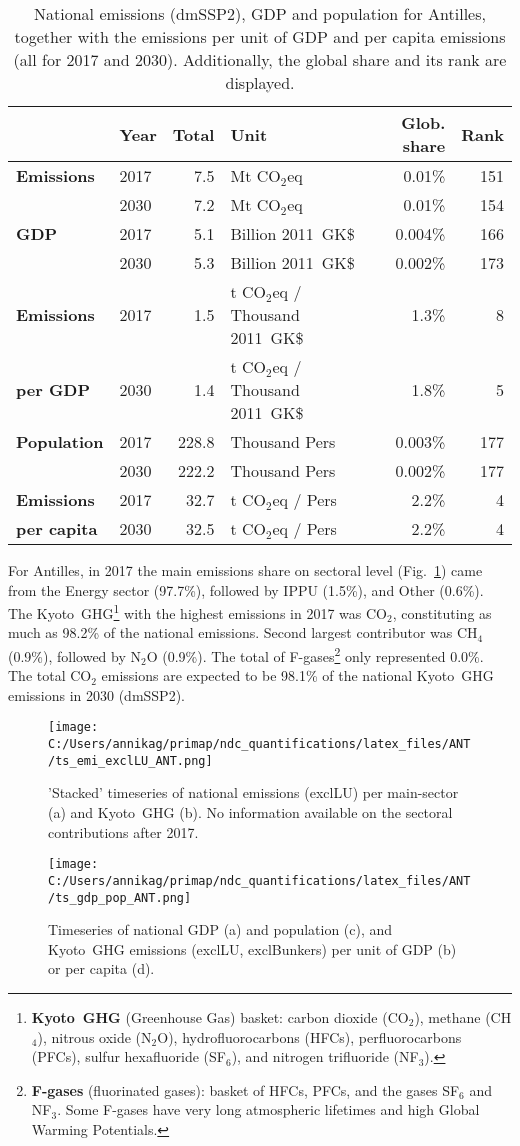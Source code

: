 \documentclass[12pt]{article}
\begin{document}
 \begin{table}[htbp]
 \centering
 \caption{National emissions (dmSSP2), GDP and population for Antilles, together with the emissions per unit of GDP and per capita emissions (all for 2017 and 2030). 
 Additionally, the global share and its rank are displayed.}
 \label{tab:overview}
 \begin{tabular}{l || l r l r r}
 \bfseries  & \bfseries Year & \bfseries Total & \bfseries Unit & \bfseries Glob. share & \bfseries Rank \tabularnewline \hline \hline
 \bfseries Emissions & 2017 & 7.5 & Mt CO$_2$eq & 0.01\% & 151 \tabularnewline 
 \bfseries  & 2030 & 7.2 & Mt CO$_2$eq & 0.01\% & 154 \tabularnewline \hline
 \bfseries GDP & 2017 & 5.1 & Billion 2011~GK\$ & 0.004\% & 166 \tabularnewline 
 \bfseries  & 2030 & 5.3 & Billion 2011~GK\$ & 0.002\% & 173 \tabularnewline \hline
 \bfseries Emissions & 2017 & 1.5 & t CO$_2$eq / Thousand 2011~GK\$ & 1.3\% & 8 \tabularnewline 
 \bfseries per GDP & 2030 & 1.4 & t CO$_2$eq / Thousand 2011~GK\$ & 1.8\% & 5 \tabularnewline \hline
 \bfseries Population & 2017 & 228.8 & Thousand Pers & 0.003\% & 177 \tabularnewline 
 \bfseries  & 2030 & 222.2 & Thousand Pers & 0.002\% & 177 \tabularnewline \hline
 \bfseries Emissions & 2017 & 32.7 & t CO$_2$eq /  Pers & 2.2\% & 4 \tabularnewline 
 \bfseries per capita & 2030 & 32.5 & t CO$_2$eq /  Pers & 2.2\% & 4 \tabularnewline 
 \end{tabular}
 \end{table}

 For Antilles, in 2017 the main emissions share on sectoral level (Fig.~\ref{fig:tsEmi}) came from the Energy sector (97.7\%), followed by IPPU (1.5\%), and Other (0.6\%). 
 The Kyoto~GHG\footnote{\textbf{Kyoto~GHG} (Greenhouse Gas) basket: carbon dioxide (CO$_2$), methane (CH$_4$), nitrous oxide (N$_2$O), hydrofluorocarbons (HFCs), perfluorocarbons (PFCs), sulfur hexafluoride (SF$_6$), and nitrogen trifluoride (NF$_3$).} with the highest emissions in 2017 was CO$_2$, constituting as much as 98.2\% of the national emissions. 
 Second largest contributor was CH$_4$ (0.9\%), followed by N$_2$O (0.9\%). 
 The total of F-gases\footnote{\textbf{F-gases} (fluorinated gases): basket of HFCs, PFCs, and the gases SF$_6$ and NF$_3$. 
 Some F-gases have very long atmospheric lifetimes and high Global Warming Potentials.} only represented 0.0\%.
 The total CO$_2$ emissions are expected to be 98.1\% of the national Kyoto~GHG emissions in 2030 (dmSSP2).
 \begin{figure}[htbp]
 \centering
 \texttt{[image: C:/Users/annikag/primap/ndc\_quantifications/latex\_files/ANT/ts\_emi\_exclLU\_ANT.png]}
 \caption{'Stacked' timeseries of national emissions (exclLU) per main-sector (a) and Kyoto~GHG (b). 
 No information available on the sectoral contributions after 2017.}
 \label{fig:tsEmi}
 \end{figure}
 \begin{figure}[htbp]
 \centering
 \texttt{[image: C:/Users/annikag/primap/ndc\_quantifications/latex\_files/ANT/ts\_gdp\_pop\_ANT.png]}
 \caption{Timeseries of national GDP (a) and population (c), and Kyoto~GHG emissions (exclLU, exclBunkers) per unit of GDP (b) or per capita (d).}
 \label{fig:tsSocioEco}
 \end{figure}
\end{document}
